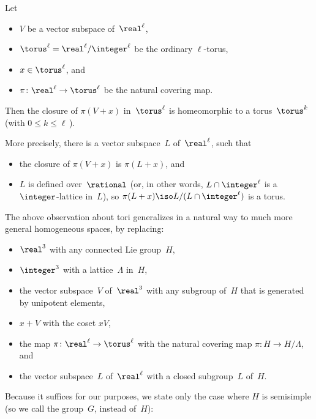 \begin{eg} \label{SubspaceInTell}
Let 
	\begin{itemize}
	\item $V$ be a vector subspace of~$\real^\ell$,
	\item $\torus^\ell   = \real^\ell / \integer^\ell$ be the ordinary $\ell$-torus,
	\item $x \in \torus^\ell$,
	and
	\item $\pi \colon \real^\ell \to \torus^\ell$ be the natural covering map.
	\end{itemize}
Then the closure of $\pi(V + x)$ in~$\torus^\ell$ is homeomorphic to a torus~$\torus^k$ (with $0\le k \le \ell$\,).  

More precisely, there is a vector subspace~$L$ of~$\real^\ell$, such that
	\begin{itemize}
	\item the closure of $\pi(V + x)$ is $\pi(L + x)$,
	and
	\item $L$ is defined over~$\rational$ (or, in other words, $L \cap \integer^\ell$ is a $\integer$-lattice in~$L$), so $\pi(L + x) \iso L/ (L \cap \integer^\ell)$ is a torus.
	\end{itemize}
 \end{eg}

The above observation about tori generalizes in a natural way to much more general homogeneous spaces, by replacing:
	\begin{itemize}
	\item $\real^3$ with any connected Lie group~$H$,
	\item $\integer^3$ with a lattice~$\Lambda$ in~$H$,
	\item the vector subspace~$V$ of~$\real^3$ with any subgroup of~$H$ that is generated by unipotent elements,
	\item $x + V$ with the coset $x V$,
	\item the map $\pi \colon \real^\ell \to \torus^\ell$ with the natural covering map $\pi \colon H \to H/\Lambda$,
	and
	\item the vector subspace~$L$ of~$\real^\ell$ with a closed subgroup~$L$ of~$H$.
	\end{itemize}
Because it suffices for our purposes, we state only the case where $H$ is semisimple (so we call the group~$G$, instead of~$H$):

